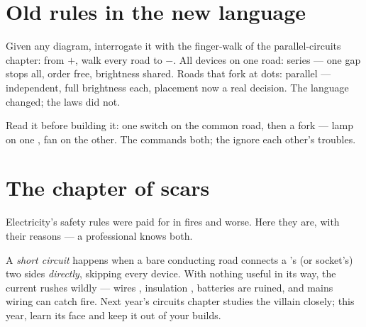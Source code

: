 \section{Old rules in the new language}

\begin{example}\label{ex:g6:circuits-and-safety:reading}
Given any diagram, interrogate it with the finger-walk of the
parallel-circuits chapter: from $+$, walk every road to $-$. All
devices on one road: series --- one gap stops all, order free,
brightness shared. Roads that fork at  dots: parallel ---
 independent, full brightness each,  placement now a
real decision. The language changed; the laws did not.
\end{example}

\begin{omfigure}

{\small Read it before building it: one switch on the common road,
then a fork --- lamp on one , fan  on the other. The
 commands both; the  ignore each other's troubles.}
\end{omfigure}

\section{The chapter of scars}

Electricity's safety rules were paid for in fires and worse. Here
they are, with their reasons --- a professional knows both.

\begin{definition}\label{def:g6:circuits-and-safety:short}
A \emph{short circuit} happens when a bare
conducting road connects a 's (or socket's) two sides
\emph{directly}, skipping every device. With nothing useful in its
way, the current rushes wildly --- wires , insulation ,
batteries are ruined, and mains wiring can catch fire. Next year's
circuits chapter studies the villain closely; this year, learn its
face and keep it out of your builds.
\end{definition}

